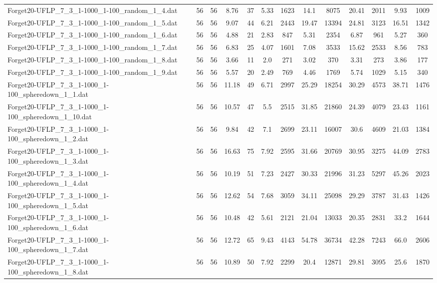 \begin{table}[!ht]
{\begin{tabular}{lcccccccccccc}
Forget20-UFLP\_7\_3\_1-1000\_1-100\_random\_1\_4.dat & 56 & 56 & 8.76 & 37 & 5.33 & 1623 & 14.1 & 8075 & 20.41 & 2011 & 9.93 & 1009 \\
Forget20-UFLP\_7\_3\_1-1000\_1-100\_random\_1\_5.dat & 56 & 56 & 9.07 & 44 & 6.21 & 2443 & 19.47 & 13394 & 24.81 & 3123 & 16.51 & 1342 \\
Forget20-UFLP\_7\_3\_1-1000\_1-100\_random\_1\_6.dat & 56 & 56 & 4.88 & 21 & 2.83 & 847 & 5.31 & 2354 & 6.87 & 961 & 5.27 & 360 \\
Forget20-UFLP\_7\_3\_1-1000\_1-100\_random\_1\_7.dat & 56 & 56 & 6.83 & 25 & 4.07 & 1601 & 7.08 & 3533 & 15.62 & 2533 & 8.56 & 783 \\
Forget20-UFLP\_7\_3\_1-1000\_1-100\_random\_1\_8.dat & 56 & 56 & 3.66 & 11 & 2.0 & 271 & 3.02 & 370 & 3.31 & 273 & 3.86 & 177 \\
Forget20-UFLP\_7\_3\_1-1000\_1-100\_random\_1\_9.dat & 56 & 56 & 5.57 & 20 & 2.49 & 769 & 4.46 & 1769 & 5.74 & 1029 & 5.15 & 340 \\
Forget20-UFLP\_7\_3\_1-1000\_1-100\_spheredown\_1\_1.dat & 56 & 56 & 11.18 & 49 & 6.71 & 2997 & 25.29 & 18254 & 30.29 & 4573 & 38.71 & 1476 \\
Forget20-UFLP\_7\_3\_1-1000\_1-100\_spheredown\_1\_10.dat & 56 & 56 & 10.57 & 47 & 5.5 & 2515 & 31.85 & 21860 & 24.39 & 4079 & 23.43 & 1161 \\
Forget20-UFLP\_7\_3\_1-1000\_1-100\_spheredown\_1\_2.dat & 56 & 56 & 9.84 & 42 & 7.1 & 2699 & 23.11 & 16007 & 30.6 & 4609 & 21.03 & 1384 \\
Forget20-UFLP\_7\_3\_1-1000\_1-100\_spheredown\_1\_3.dat & 56 & 56 & 16.63 & 75 & 7.92 & 2595 & 31.66 & 20769 & 30.95 & 3275 & 44.09 & 2783 \\
Forget20-UFLP\_7\_3\_1-1000\_1-100\_spheredown\_1\_4.dat & 56 & 56 & 10.19 & 51 & 7.23 & 2427 & 30.33 & 21996 & 31.23 & 5297 & 45.26 & 2023 \\
Forget20-UFLP\_7\_3\_1-1000\_1-100\_spheredown\_1\_5.dat & 56 & 56 & 12.62 & 54 & 7.68 & 3059 & 34.11 & 25098 & 29.29 & 3787 & 31.43 & 1426 \\
Forget20-UFLP\_7\_3\_1-1000\_1-100\_spheredown\_1\_6.dat & 56 & 56 & 10.48 & 42 & 5.61 & 2121 & 21.04 & 13033 & 20.35 & 2831 & 33.2 & 1644 \\
Forget20-UFLP\_7\_3\_1-1000\_1-100\_spheredown\_1\_7.dat & 56 & 56 & 12.72 & 65 & 9.43 & 4143 & 54.78 & 36734 & 42.28 & 7243 & 66.0 & 2606 \\
Forget20-UFLP\_7\_3\_1-1000\_1-100\_spheredown\_1\_8.dat & 56 & 56 & 10.89 & 50 & 7.92 & 2299 & 20.4 & 12871 & 29.81 & 3095 & 25.6 & 1870 \\

\end{tabular}}
\end{table}
